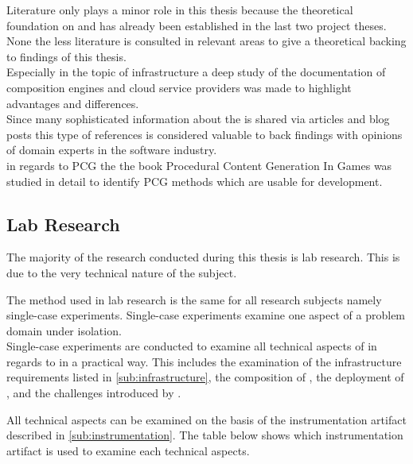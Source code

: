 Literature only plays a minor role in this thesis because the theoretical
foundation on \mss{} and \ogs{} has already been established in the last two
project theses. None the less literature is consulted in relevant areas to give
a theoretical backing to findings of this thesis.\\

Especially in the topic of \ms{} infrastructure a deep study of the
documentation of composition engines and cloud service providers was made
to highlight advantages and differences.\\

Since many sophisticated information about the \mss{} is shared via articles
and blog posts this type of references is considered valuable to back findings
with opinions of domain experts in the software industry.\\

in regards to PCG the the book Procedural Content Generation In
Games\cite{shaker2014procedural} was studied in detail to identify PCG methods
which are usable for \og{} development.

\subsection{Lab Research}
\label{sub:lab_reserach}

The majority of the research conducted during this thesis is lab research. This
is due to the very technical nature of the subject. 

The method used in lab research is the same for all research subjects namely
single-case experiments\cite{wieringa2014design_science}. Single-case
experiments examine one aspect of a problem domain under isolation.\\

Single-case experiments are conducted to examine all technical aspects of \mss{}
in regards to \ogs{} in a practical way. This includes the examination of the
\ms{} infrastructure requirements listed in \autoref{sub:infrastructure}, the
composition of \mss{}, the deployment of \mss{}, and the challenges introduced
by \mss{}.

All technical aspects can be examined on the basis of the instrumentation
artifact described in \autoref{sub:instrumentation}. The table below shows which
instrumentation artifact is used to examine each technical aspects.


